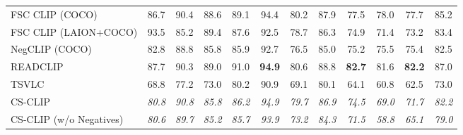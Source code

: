 \begin{table}[t]
\begin{adjustbox}{max width=\textwidth}
\begin{tabular}{p{5cm}ccc|cccc|ccc|c}
    FSC CLIP (COCO) & 86.7 & 90.4 & 88.6 & 89.1 & 94.4 & 80.2 & 87.9 & 77.5 & 78.0 & 77.7 & 85.2 \\
    FSC CLIP (LAION+COCO) & 93.5 & 85.2 & 89.4 & 87.6 & 92.5 & 78.7 & 86.3 & 74.9 & 71.4 & 73.2 & 83.4 \\
    NegCLIP (COCO) & 82.8 & 88.8 & 85.8 & 85.9 & 92.7 & 76.5 & 85.0 & 75.2 & 75.5 & 75.4 & 82.5 \\
    READCLIP & 87.7 & 90.3 & 89.0 & 91.0 & \textbf{94.9} & 80.6 & 88.8 & \textbf{82.7} & 81.6 & \textbf{82.2} & 87.0 \\
    TSVLC & 68.8 & 77.2 & 73.0 & 80.2 & 90.9 & 69.1 & 80.1 & 64.1 & 60.8 & 62.5 & 73.0 \\
    \midrule
    CS-CLIP & \emph{80.8} & \emph{90.8} & \emph{85.8} & \emph{86.2} & \emph{94.9} & \emph{79.7} & \emph{86.9} & \emph{74.5} & \emph{69.0} & \emph{71.7} & \emph{82.2} \\
    CS-CLIP (w/o Negatives) & \emph{80.6} & \emph{89.7} & \emph{85.2} & \emph{85.7} & \emph{93.9} & \emph{73.2} & \emph{84.3} & \emph{71.5} & \emph{58.8} & \emph{65.1} & \emph{79.0} \\
    \bottomrule
  \end{tabular}
  \end{adjustbox}
\end{table}